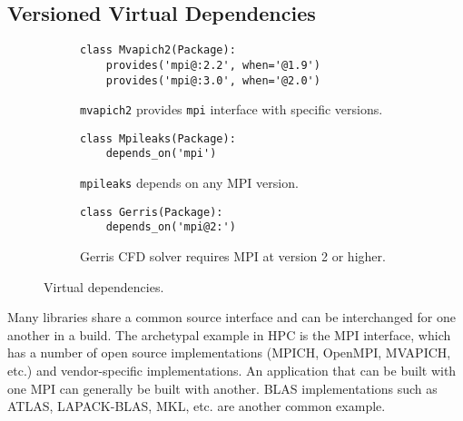 
\subsection{Versioned Virtual Dependencies}

\begin{figure}
%
\begin{subfigure}{\linewidth}
	\begin{verbatim}
class Mvapich2(Package):    
    provides('mpi@:2.2', when='@1.9')
    provides('mpi@:3.0', when='@2.0')
\end{verbatim}
	\caption{%
		{\tt mvapich2} provides {\tt mpi} interface with specific versions.
		\label{fig:virtual-deps-provides}
	}
\end{subfigure}
%
\begin{subfigure}{\linewidth}
	\begin{verbatim}
class Mpileaks(Package):    
    depends_on('mpi')
\end{verbatim}
	\caption{%
		{\tt mpileaks} depends on any MPI version.
		\label{fig:virtual-deps-mpileaks}
	}
\end{subfigure}
%
\begin{subfigure}{\linewidth}
	\begin{verbatim}
class Gerris(Package):
    depends_on('mpi@2:')
\end{verbatim}
	\caption{%
		Gerris CFD solver requires MPI at version 2 or higher.
		\label{fig:virtual-deps-depends}
	}
\end{subfigure}
%
\caption{
	Virtual dependencies.
	\label{fig:virtual-deps}
}
\end{figure}

Many libraries share a common source interface and can be interchanged for
one another in a build.
The archetypal example in HPC is the MPI interface, which has a number of
open source implementations (MPICH, OpenMPI, MVAPICH, etc.) and vendor-specific
implementations. An application that can be built with one MPI can generally be
built with another.  BLAS implementations such as ATLAS, LAPACK-BLAS, MKL, etc.
are another common example.

